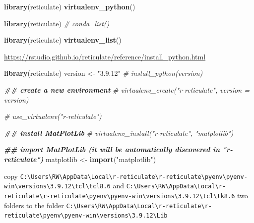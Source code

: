 \documentclass[
]{book}
\newenvironment{Shaded}{\begin{snugshade}}{\end{snugshade}}
\newcommand{\CommentTok}[1]{\textcolor[rgb]{0.56,0.35,0.01}{\textit{#1}}}
\newcommand{\DocumentationTok}[1]{\textcolor[rgb]{0.56,0.35,0.01}{\textbf{\textit{#1}}}}
\newcommand{\FunctionTok}[1]{\textcolor[rgb]{0.13,0.29,0.53}{\textbf{#1}}}
\newcommand{\NormalTok}[1]{#1}
\newcommand{\OtherTok}[1]{\textcolor[rgb]{0.56,0.35,0.01}{#1}}
\newcommand{\StringTok}[1]{\textcolor[rgb]{0.31,0.60,0.02}{#1}}
\theoremstyle{definition}
\theoremstyle{definition}
\theoremstyle{definition}
\theoremstyle{definition}
\theoremstyle{remark}
\begin{document}
\begin{Shaded}
\begin{Highlighting}[]
\FunctionTok{library}\NormalTok{(reticulate)}
\FunctionTok{virtualenv\_python}\NormalTok{()}
\end{Highlighting}
\end{Shaded}

\begin{Shaded}
\begin{Highlighting}[]
\FunctionTok{library}\NormalTok{(reticulate)}
\CommentTok{\# conda\_list()}
\end{Highlighting}
\end{Shaded}

\begin{Shaded}
\begin{Highlighting}[]
\FunctionTok{library}\NormalTok{(reticulate)}
\FunctionTok{virtualenv\_list}\NormalTok{()}
\end{Highlighting}
\end{Shaded}

\url{https://rstudio.github.io/reticulate/reference/install_python.html}

\begin{Shaded}
\begin{Highlighting}[]
\FunctionTok{library}\NormalTok{(reticulate)}
\NormalTok{version }\OtherTok{\textless{}{-}} \StringTok{"3.9.12"}
\CommentTok{\# install\_python(version)}

\DocumentationTok{\#\# create a new environment}
\CommentTok{\# virtualenv\_create("r{-}reticulate", version = version)}

\CommentTok{\# use\_virtualenv("r{-}reticulate")}

\DocumentationTok{\#\# install MatPlotLib}
\CommentTok{\# virtualenv\_install("r{-}reticulate", "matplotlib")}

\DocumentationTok{\#\# import MatPlotLib (it will be automatically discovered in "r{-}reticulate")}
\NormalTok{matplotlib }\OtherTok{\textless{}{-}} \FunctionTok{import}\NormalTok{(}\StringTok{"matplotlib"}\NormalTok{)}
\end{Highlighting}
\end{Shaded}

copy \texttt{C:\textbackslash{}Users\textbackslash{}RW\textbackslash{}AppData\textbackslash{}Local\textbackslash{}r-reticulate\textbackslash{}r-reticulate\textbackslash{}pyenv\textbackslash{}pyenv-win\textbackslash{}versions\textbackslash{}3.9.12\textbackslash{}tcl\textbackslash{}tcl8.6} and \texttt{C:\textbackslash{}Users\textbackslash{}RW\textbackslash{}AppData\textbackslash{}Local\textbackslash{}r-reticulate\textbackslash{}r-reticulate\textbackslash{}pyenv\textbackslash{}pyenv-win\textbackslash{}versions\textbackslash{}3.9.12\textbackslash{}tcl\textbackslash{}tk8.6} two folders to the folder \texttt{C:\textbackslash{}Users\textbackslash{}RW\textbackslash{}AppData\textbackslash{}Local\textbackslash{}r-reticulate\textbackslash{}r-reticulate\textbackslash{}pyenv\textbackslash{}pyenv-win\textbackslash{}versions\textbackslash{}3.9.12\textbackslash{}Lib}
\end{document}
